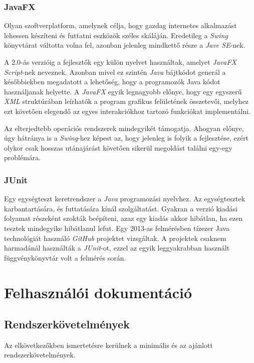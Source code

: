 \documentclass{elteikthesis}
\begin{document}
\subsection{JavaFX}
Olyan szoftverplatform, amelynek célja, hogy gazdag internetes alkalmazást lehessen készíteni és futtatni eszközök széles skáláján. Eredetileg a \emph{Swing} könyvtárat váltotta volna fel, azonban jelenleg mindkettő része a \emph{Jave SE}-nek. \par
 A 2.0-ás verzióig a fejlesztők egy külön nyelvet használtak, amelyet \emph{JavaFX Script}-nek neveznek. Azonban mivel ez szintén \emph{Java} bájtkódot generál a későbbiekben megadatott a lehetőség, hogy a programozók Java kódot használjanak helyette. A \emph{JavaFX} egyik legnagyobb előnye, hogy egy egyszerű \emph{XML} struktúrában leírhatók a program grafikus felületének összetevői, melyhez ezt követően elegendő az egyes interakciókhoz tartozó funkciókat implementálni.\par Az elterjedtebb operációs rendszerek mindegyikét támogatja. Ahogyan előnye, úgy hátránya is a \emph{Swing}-hez képest az, hogy jelenleg is folyik a fejlesztése, ezért olykor csak hosszas utánajárást követően sikerül megoldást találni egy-egy problémára.
 
\subsection{JUnit}
Egy egységteszt keretrendszer a \emph{Java} programozási nyelvhez. Az egységtesztek karbantartására, és futtatására kínál szolgáltatást. Gyakran a verzió kiadási folyamat részeként szokták beépíteni, azaz egy kiadás akkor hibátlan, ha ezen tesztek mindegyike hibátlanul lefut. Egy 2013-as felmérésben\cite{Survey} tízezer Java technológiát használó \emph{GitHub} projektet vizsgáltak. A projektek csaknem harmadánál használták a \emph{JUnit}-ot, ezzel az egyik leggyakrabban használt függvénykönyvtár volt a felmérés során.

\chapter{Felhasználói dokumentáció}
\section{Rendszerkövetelmények}
Az elkövetkezőkben ismertetésre kerülnek a minimális és az ajánlott rendszerkövetelmények.
\end{document}
